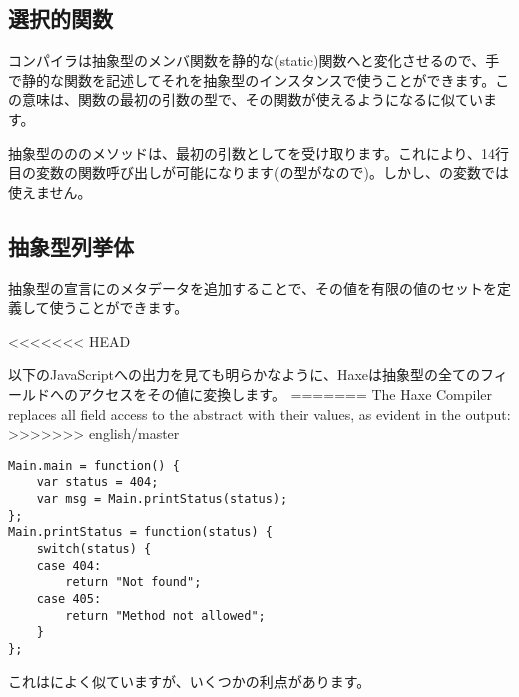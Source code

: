 \subsection{選択的関数}
\label{types-abstract-selective-functions}

コンパイラは抽象型のメンバ関数を静的な(static)関数へと変化させるので、手で静的な関数を記述してそれを抽象型のインスタンスで使うことができます。この意味は、関数の最初の引数の型で、その関数が使えるようになるに似ています。


抽象型のののメソッドは、最初の引数としてを受け取ります。これにより、14行目の変数の関数呼び出しが可能になります(の型がなので)。しかし、の変数では使えません。



\subsection{抽象型列挙体}
\label{types-abstract-enum}

抽象型の宣言にのメタデータを追加することで、その値を有限の値のセットを定義して使うことができます。


<<<<<<< HEAD

以下のJavaScriptへの出力を見ても明らかなように、Haxeは抽象型の全てのフィールドへのアクセスをその値に変換します。
=======
The Haxe Compiler replaces all field access to the  abstract with their values, as evident in the  output:
>>>>>>> english/master

\begin{lstlisting}
Main.main = function() {
	var status = 404;
	var msg = Main.printStatus(status);
};
Main.printStatus = function(status) {
	switch(status) {
	case 404:
		return "Not found";
	case 405:
		return "Method not allowed";
	}
};
\end{lstlisting}

これはによく似ていますが、いくつかの利点があります。

